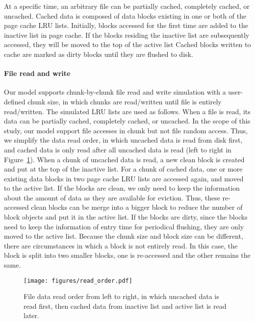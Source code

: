 \documentclass[conference]{IEEEtran}
\begin{document}
			At a specific time, an arbitrary file can be partially cached, completely cached, 
			or uncached.
			Cached data is composed of data blocks existing in one or both
            of the page cache LRU lists. 
            Initially, blocks accessed for the first time are added to the inactive list in 
            page cache. 
            If the blocks residing the inactive list are subsequently accessed, 
            they will be moved to the top of the active list
            Cached blocks written to cache are marked as dirty blocks until 
            they are flushed to disk.

			\paragraph*{File read and write}
            Our model supports chunk-by-chunk file read and write simulation
            with a user-defined chunk size, in which chunks are read/written
            until file is entirely read/written.
            The simulated LRU lists are used as follows. 
            When a file is read, its data can be partially cached, completely cached, 
            or uncached. 
            In the scope of this study, our model support file accesses in chunk 
            but not file random access.
            Thus, we simplify the data read order, in which uncached data is read 
            from disk first, and cached data is only read after all uncached data is read 
            (left to right in Figure~\ref{fig:read_order}).
            When a chunk of uncached data is read, a new clean block is created 
            and put at the top of the inactive list. 
            For a chunk of cached data, one or more existing data blocks in two 
            page cache LRU lists are accessed again, and moved to the active list. 
			If the blocks are clean, we only need to keep the information about the 
			amount of data as they are available for eviction. 
			Thus, these re-accessed clean blocks can be merge into a bigger block 
			to reduce the number of block objects and put it in the active list. 
            If the blocks are dirty, since the blocks need to keep the information 
            of entry time for periodical flushing, they are only moved to the active list. 
			Because the chunk size and block size can be different, there are circumstances 
			in which a block is not entirely read. 
			In this case, the block is split into two smaller blocks, one is re-accessed 
			and the other remains the same.
			
			\begin{figure}
   				\centering
   				\texttt{[image: figures/read\_order.pdf]}
   				\caption{File data read order from left to right, in which uncached data 
   				is read first, then cached data from inactive list and active list is read later.}	
   				\label{fig:read_order}
			\end{figure}	
			
\end{document}

